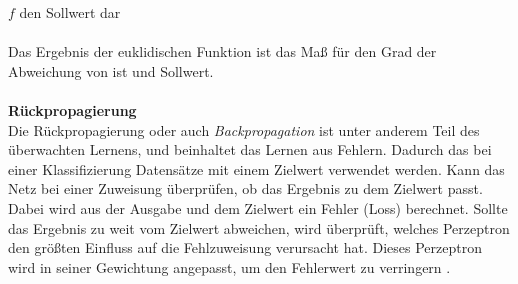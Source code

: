 \documentclass[a4paper,12pt,oneside]{article}
\begin{document}
	$f$ den Sollwert dar\\\\
Das Ergebnis der euklidischen Funktion ist das Maß für den Grad der Abweichung von ist und Sollwert.\\\\
\textbf{Rückpropagierung}\\
Die Rückpropagierung oder auch \textit{Backpropagation} \cite{ertel2013grundkurs} ist unter anderem Teil des überwachten Lernens, und beinhaltet das Lernen aus Fehlern. Dadurch das bei einer Klassifizierung Datensätze mit einem Zielwert verwendet werden. Kann das Netz bei einer Zuweisung überprüfen, ob das Ergebnis zu dem Zielwert passt. Dabei wird aus der Ausgabe und dem Zielwert ein Fehler (Loss) berechnet. Sollte das Ergebnis zu weit vom Zielwert abweichen, wird überprüft, welches Perzeptron den größten Einfluss auf die Fehlzuweisung verursacht hat. Dieses Perzeptron wird in seiner Gewichtung angepasst, um den Fehlerwert zu verringern \cite{goodfellow2016deep}. 
\end{document}

